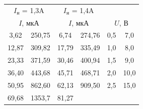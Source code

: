 \documentclass[a4paper,12pt]{article}
\begin{document}
\begin{table}[H]\label{tab: I(U) 1 and 2}
    \centering
    \begin{tabular}{|cc|cc|cc|}
        \hline
        \multicolumn{2}{|c|}{{\color[HTML]{000000} $I_н$ = 1,3A}} &
          \multicolumn{2}{c|}{{\color[HTML]{000000} $I_н$ = 1,4A}} &
          \multicolumn{2}{c|}{{\color[HTML]{000000} }} \\ \cline{1-4}
        \multicolumn{2}{|c|}{{\color[HTML]{000000} $I$, мкА}} &
           \multicolumn{2}{c|}{{\color[HTML]{000000} $I$, мкА}} &
           \multicolumn{2}{c|}{{{\color[HTML]{000000} $U$, В}}} \\ \hline
        \multicolumn{1}{|c|}{{\color[HTML]{000000} 3,62}} &
          {\color[HTML]{000000} 250,75} &
          \multicolumn{1}{c|}{{\color[HTML]{000000} 6,74}} &
          {\color[HTML]{000000} 274,76} &
          \multicolumn{1}{c|}{{\color[HTML]{000000} 0,5}} &
          {\color[HTML]{000000} 7,0} \\ \hline
        \multicolumn{1}{|c|}{{\color[HTML]{000000} 12,87}} &
          {\color[HTML]{000000} 309,82} &
          \multicolumn{1}{c|}{{\color[HTML]{000000} 17,79}} &
          {\color[HTML]{000000} 335,49} &
          \multicolumn{1}{c|}{{\color[HTML]{000000} 1,0}} &
          {\color[HTML]{000000} 8,0} \\ \hline
        \multicolumn{1}{|c|}{{\color[HTML]{000000} 23,33}} &
          {\color[HTML]{000000} 371,59} &
          \multicolumn{1}{c|}{{\color[HTML]{000000} 30,46}} &
          {\color[HTML]{000000} 400,94} &
          \multicolumn{1}{c|}{{\color[HTML]{000000} 1,5}} &
          {\color[HTML]{000000} 9,0} \\ \hline
        \multicolumn{1}{|c|}{{\color[HTML]{000000} 36,40}} &
          {\color[HTML]{000000} 443,68} &
          \multicolumn{1}{c|}{{\color[HTML]{000000} 45,71}} &
          {\color[HTML]{000000} 468,71} &
          \multicolumn{1}{c|}{{\color[HTML]{000000} 2,0}} &
          {\color[HTML]{000000} 10,0} \\ \hline
        \multicolumn{1}{|c|}{{\color[HTML]{000000} 50,95}} &
          {\color[HTML]{000000} 862,60} &
          \multicolumn{1}{c|}{{\color[HTML]{000000} 62,13}} &
          {\color[HTML]{000000} 909,50} &
          \multicolumn{1}{c|}{{\color[HTML]{000000} 2,5}} &
          {\color[HTML]{000000} 15,0} \\ \hline
        \multicolumn{1}{|c|}{{\color[HTML]{000000} 69,68}} &
          {\color[HTML]{000000} 1353,7} &
          \multicolumn{1}{c|}{{\color[HTML]{000000} 81,27}} &

\end{tabular}
\end{table}
\end{document}
